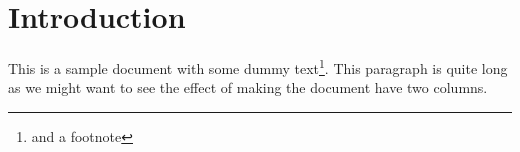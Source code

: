 \documentclass{article} %
\begin{document}
\section{Introduction}

This is a sample document with some dummy
text\footnote{and a footnote}. This paragraph is quite
long as we might want to see the effect of making the
document have two columns.
\end{document}
